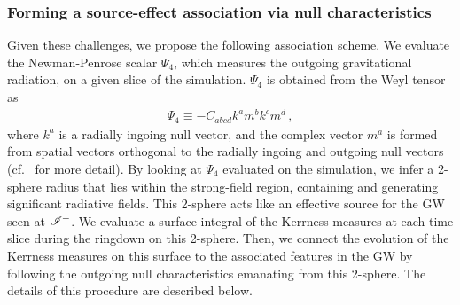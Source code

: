 \subsubsection{Forming a source-effect association via null characteristics}
\label{sec:AFQ_theory}



Given these challenges, we propose the following association scheme. We evaluate the Newman-Penrose scalar $\Psi_4$, which measures the outgoing gravitational radiation, on a given slice of the simulation. $\Psi_4$ is obtained from the Weyl tensor as
\begin{align}
\label{eq:Psi4}
\Psi_4 \equiv -C_{abcd}k^a\bar{m}^b k^c \bar{m}^d\,,
\end{align}
where $k^a$ is a radially ingoing null vector, and the complex vector $m^a$ is formed from spatial vectors orthogonal to the radially ingoing and outgoing null vectors (cf.~\cite{baumgarteShapiroBook} for more detail). By looking at $\Psi_{4}$ evaluated on the simulation, we infer a 2-sphere radius that lies within the strong-field region, containing and generating significant radiative fields. This 2-sphere acts like an effective source for the GW seen at $\mathscr{I^+}$. We evaluate a surface integral of the Kerrness measures at each time slice during the ringdown on this 2-sphere. Then, we connect the evolution of the Kerrness measures on this surface to the associated features in the GW by following the outgoing null characteristics emanating from this 2-sphere. The details of this procedure are described below. 




